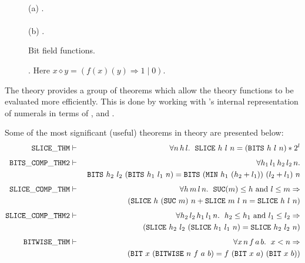 \begin{figure}
\begin{center}
 \\[3mm]
(a) . \\[6mm]
 \\[3mm]
(b) .
\end{center}
\caption{Bit field functions.\label{bits-slice}}
\end{figure}

\begin{figure}
\begin{center}

\end{center}
\caption{. Here $x\diamond y = (f(x)(y) \Rightarrow 1 \mid 0)$.\label{bitwise}}
\end{figure}

The  theory provides a group of theorems which allow the  theory functions to be evaluated more efficiently.
This is done by working with \HOL's internal representation of numerals \ie{} in terms of ,  and .

Some of the most significant (useful) theorems in  theory are presented below:
\begin{eqnarray*}
\mathtt{SLICE\_THM} & \vdash & \forall n\,h\,l.\ \;\slice\ h\ l\ n = (\bits\ h\ l\ n) * 2^l \\[4pt]
\mathtt{BITS\_COMP\_THM2} & \vdash & \forall h_1\,l_1\,h_2\,l_2\,n.\\*
&& \ \bits\ h_2\ l_2\ (\bits\ h_1\ l_1\ n) = \bits\ (\minn\ h_1\ (h_2 + l_1))\ (l_2 + l_1)\ n \\[4pt]
\mathtt{SLICE\_COMP\_THM} & \vdash &
   \forall h\,m\,l\,n.\ \;\suc(m) \leq h \mbox{ and } l \leq m \Rightarrow \\*
&& \quad (\slice\ h\ (\suc\ m)\ n + \slice\ m\ l\ n = \slice\ h\ l\ n) \\[4pt]
\mathtt{SLICE\_COMP\_THM2} & \vdash &
   \forall h_2\,l_2\,h_1\,l_1\,n.\ \; h_2 \leq h_1 \mbox{ and } l_1 \leq l_2 \Rightarrow \\*
&& \quad (\slice\ h_2\ l_2\ (\slice\ h_1\ l_1\ n) = \slice\ h_2\ l_2\ n) \\[4pt]
\mathtt{BITWISE\_THM} & \vdash &
   \forall x\,n\,f\,a\,b.\ \;
        x < n \Rightarrow \\*
&& \quad (\bit\ x\ (\bitwise\ n\ f\ a\ b) = f\ (\bit\ x\ a)\ (\bit\ x\ b))
\end{eqnarray*}

